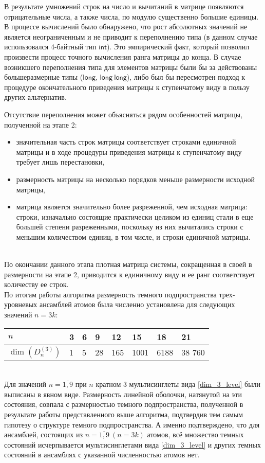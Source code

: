 В результате умножений строк на число и вычитаний в матрице появля­ются отрицательные числа, а также числа, по модулю существенно большие единицы. В процессе вычислений было обнаружено, что рост абсолютных зна­чений не является неограниченным и не приводит к переполнению типа (в данном случае использовался 4-байтный тип $\mathsf{int}$). Это эмпирический факт, кото­рый позволил произвести процесс точного вычисления ранга матрицы до конца. В случае возникшего переполнения типа для элементов матрицы были бы за­ действованы большеразмерные типы ($\mathsf{long}$, $\mathsf{long~long}$), либо был бы пересмотрен подход к процедуре окончательного приведения матрицы к ступенчатому виду в пользу других альтернатив.

\clearpage
Отсутствие переполнения может объясняться рядом особенностей мат­рицы, полученной на этапе 2:
\begin{itemize}
\item{значительная часть строк матрицы соответствует строками единичной матрицы и в ходе процедуры приведения матрицы к ступенчатому виду требует лишь перестановки,}
\item{размерность матрицы на несколько порядков меньше размерности ис­ходной матрицы,}
\item{матрица является значительно более разреженной, чем исходная мат­рица: строки, изначально состоящие практически целиком из единиц стали в еще большей степени разреженными, поскольку из них вычи­тались строки с меньшим количеством единиц, в том числе, и строки единичной матрицы.}
\end{itemize}
\
\\
\indent По окончании данного этапа плотная матрица системы, сокращенная в своей в размерности на этапе 2, приводится к единичному виду и ее ранг соот­ветствует количеству ее строк.
\\[12pt]
\indent По итогам работы алгоритма размерность темного подпространства трех­уровневых ансамблей атомов была численно установлена для следующих значений $n = 3k$:

\noindent\begin{tabular}[t]{|p{5em}|p{3em}|p{3em}|p{3em}|p{3em}|p{4em}|p{4em}|p{4em}|}
	\hline
	$n$ & 3 & 6 & 9 & 12 & 15 & 18 & 21 \\
	\hline
	$\dim(D^{(3)}_n)$ & 1 & 5 & 28 & 165 & 1001 & 6188 & 38 760 \\
	\hline
\end{tabular}
\
\\[24pt]
\indent Для значений $n = \overline{1, 9}$ при $n$ кратном 3 мультисинглеты вида \eqref{dim_3_level} были выписаны в явном виде. Размерность линейной оболочки, натянутой на эти состояния, совпала с размерностью темного подпространства, полученной в результате работы представленного выше алгоритма, подтвердив тем самым гипотезу о структуре темного подпространства. А именно подтверждено, что для ансамблей, состоящих из $n = \overline{1, 9}~(n = 3k)$ атомов, всё множество тем­ных состояний исчерпывается мультисинглетами вида \eqref{dim_3_level} и других темных состояний в ансамблях с указанной численностью атомов нет.

